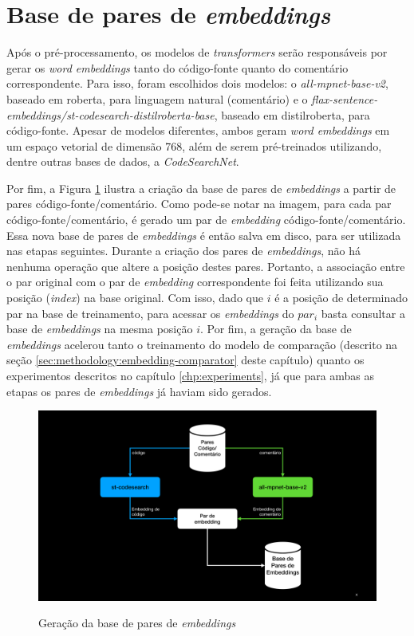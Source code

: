 \section{Base de pares de \textit{embeddings}}
\label{sec:methodology:encoders}
Após o pré-processamento, os modelos de \textit{transformers} serão responsáveis por gerar os \textit{word embeddings} tanto do código-fonte quanto do comentário correspondente. Para isso, foram escolhidos dois modelos: o \textit{all-mpnet-base-v2}, baseado em \gls{roberta}, para linguagem natural (comentário) e o \textit{flax-sentence-embeddings/st-codesearch-distilroberta-base}, baseado em \gls{distilroberta}, para código-fonte. Apesar de modelos diferentes, ambos geram \textit{word embeddings} em um espaço vetorial de dimensão 768, além de serem pré-treinados utilizando, dentre outras bases de dados, a \textit{CodeSearchNet}.

Por fim, a Figura \ref{fig:metodology-db-embeddings} ilustra a criação da base de pares de \textit{embeddings} a partir de pares código-fonte/comentário. Como pode-se notar na imagem, para cada par código-fonte/comentário, é gerado um par de \textit{embedding} código-fonte/comentário. Essa nova base de pares de \textit{embeddings} é então salva em disco, para ser utilizada nas etapas seguintes. Durante a criação dos pares de \textit{embeddings}, não há nenhuma operação que altere a posição destes pares. Portanto, a associação entre o par original com o par de \textit{embedding} correspondente foi feita utilizando sua posição (\textit{index}) na base original. Com isso, dado que $i$ é a posição de determinado par na base de treinamento, para acessar os \textit{embeddings} do $par_i$ basta consultar a base de \textit{embeddings} na mesma posição $i$. Por fim, a geração da base de \textit{embeddings} acelerou tanto o treinamento do modelo de comparação (descrito na seção \ref{sec:methodology:embedding-comparator} deste capítulo) quanto os experimentos descritos no capítulo \ref{chp:experiments}, já que para ambas as etapas os pares de \textit{embeddings} já haviam sido gerados.

\begin{figure}[H]
    \centering
        \caption{Geração da base de pares de \textit{embeddings}}
        \includegraphics[scale=0.5]{db_embeddings.pdf}
        \label{fig:metodology-db-embeddings}
\end{figure}

